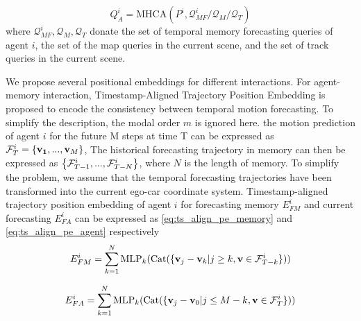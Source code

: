 \begin{equation}
  Q_A^i = \text{MHCA}(P^i, \mathcal{Q}_{MF}^i / \mathcal{Q}_M / \mathcal{Q}_T)
  \label{eq:scene_interaction}
\end{equation}
where $\mathcal{Q}_{MF}^i, \mathcal{Q}_M, \mathcal{Q}_T$ donate the set of temporal memory forecasting queries of agent $i$, the set of the map queries in the current scene, and the set of track queries in the current scene. 


We propose several positional embeddings for different interactions. For agent-memory interaction, Timestamp-Aligned Trajectory Position Embedding is proposed to encode the consistency between temporal motion forecasting. To simplify the description, the modal order $m$ is ignored here. the motion prediction of agent $i$ for the future M steps at time T can be expressed as  ${\cal F}_T^i = \{ {{\bf{v}}_{\bf{1}}},...,{{\bf{v}}_M}\}$, The historical forecasting trajectory in memory can then be expressed as $\left\{ {{\cal F}_{T - 1}^i,...,{\cal F}_{T - N}^i} \right\}$,  where $N$ is the length of memory. To simplify the problem, we assume that the temporal forecasting trajectories have been transformed into the current ego-car coordinate system. Timestamp-aligned trajectory position embedding of agent $i$ for forecasting memory $E_{FM}^i$ and current forecasting $E_{FA}^i$ can be expressed as \cref{eq:ts_align_pe_memory} and \cref{eq:ts_align_pe_agent} respectively 
\begin{equation}
    E_{FM}^i = \sum\limits_{k = 1}^N {{\rm{ML}}{{\rm{P}}_k}({\rm{Cat}}(\{ {{\bf{v}}_j} - {{\bf{v}}_k}|j \ge k,{\bf{v}} \in {\cal F}_{T - k}^i\} ))} 
    \label{eq:ts_align_pe_memory}
\end{equation}

\begin{equation}
    E_{FA}^i = \sum\limits_{k = 1}^N {{\rm{ML}}{{\rm{P}}_k}({\rm{Cat}}(\{ {{\bf{v}}_j} - {{\bf{v}}_0}|j \le M - k,{\bf{v}} \in {\cal F}_T^i\} ))} 
    \label{eq:ts_align_pe_agent}
\end{equation}

